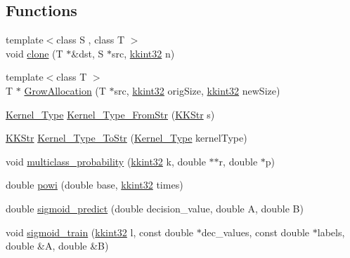 \subsection*{Functions}
\begin{DoxyCompactItemize}
\item 
{\footnotesize template$<$class S , class T $>$ }\\void \hyperlink{namespace_s_v_m289___b_f_s_a5030305fb16e512e60b31d312ddda3c6}{clone} (T $\ast$\&dst, S $\ast$src, \hyperlink{namespace_k_k_b_a8fa4952cc84fda1de4bec1fbdd8d5b1b}{kkint32} n)
\item 
{\footnotesize template$<$class T $>$ }\\T $\ast$ \hyperlink{namespace_s_v_m289___b_f_s_a75e966b67532afc70df4361a8f29f10b}{Grow\+Allocation} (T $\ast$src, \hyperlink{namespace_k_k_b_a8fa4952cc84fda1de4bec1fbdd8d5b1b}{kkint32} orig\+Size, \hyperlink{namespace_k_k_b_a8fa4952cc84fda1de4bec1fbdd8d5b1b}{kkint32} new\+Size)
\item 
\hyperlink{namespace_s_v_m289___b_f_s_aad17f5250658b3fe42ba842df2ef2c6d}{Kernel\+\_\+\+Type} \hyperlink{namespace_s_v_m289___b_f_s_ac4cd562e7f3752f32480a23e5a06e7e3}{Kernel\+\_\+\+Type\+\_\+\+From\+Str} (\hyperlink{class_k_k_b_1_1_k_k_str}{K\+K\+Str} s)
\item 
\hyperlink{class_k_k_b_1_1_k_k_str}{K\+K\+Str} \hyperlink{namespace_s_v_m289___b_f_s_a5b3db3f5393a3b919629d2d5468d5951}{Kernel\+\_\+\+Type\+\_\+\+To\+Str} (\hyperlink{namespace_s_v_m289___b_f_s_aad17f5250658b3fe42ba842df2ef2c6d}{Kernel\+\_\+\+Type} kernel\+Type)
\item 
void \hyperlink{namespace_s_v_m289___b_f_s_a891a677bee703ad8feda11a3c7e99363}{multiclass\+\_\+probability} (\hyperlink{namespace_k_k_b_a8fa4952cc84fda1de4bec1fbdd8d5b1b}{kkint32} k, double $\ast$$\ast$r, double $\ast$p)
\item 
double \hyperlink{namespace_s_v_m289___b_f_s_ac4f2bb7782ed887ee0589d5bcbdd731d}{powi} (double base, \hyperlink{namespace_k_k_b_a8fa4952cc84fda1de4bec1fbdd8d5b1b}{kkint32} times)
\item 
double \hyperlink{namespace_s_v_m289___b_f_s_a5a02bb36bfbcc78735ba18c0580b8a97}{sigmoid\+\_\+predict} (double decision\+\_\+value, double A, double B)
\item 
void \hyperlink{namespace_s_v_m289___b_f_s_a5d8aba7048d23e9abbff3e055850a471}{sigmoid\+\_\+train} (\hyperlink{namespace_k_k_b_a8fa4952cc84fda1de4bec1fbdd8d5b1b}{kkint32} l, const double $\ast$dec\+\_\+values, const double $\ast$labels, double \&A, double \&B)
\item 
$$
\end{DoxyCompactItemize}

